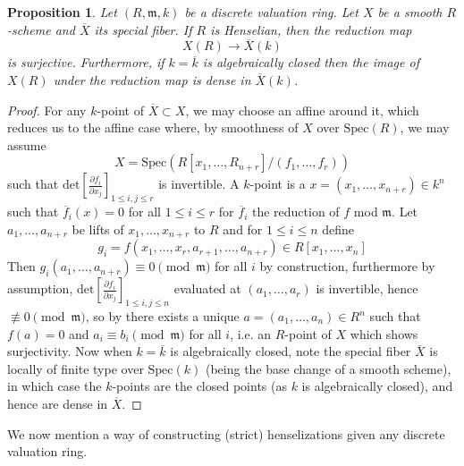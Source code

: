 \documentclass{article}
\theoremstyle{definition}
\theoremstyle{remark}
\theoremstyle{plain}
\newtheorem{proposition}[theorem]{Proposition}
\newcommand{\mk}[1]{\mathfrak{#1}}
\begin{document}
\begin{proposition}\label{prop:3.6}
	Let $(R, \mk{m}, k)$ be a discrete valuation ring. 
	Let $X$ be a smooth $R$-scheme and $\overline{X}$ its special fiber. 
	If $R$ is Henselian, then the reduction map
	\[X(R) \to \overline{X}(k)\]
	is surjective.
	Furthermore, if $k = \overline{k}$ is algebraically closed then the image of $X(R)$ under the reduction map is dense in $\overline{X}(k)$.
\end{proposition}

\begin{proof}
	For any $k$-point of $\overline{X} \subset X$, we may choose an affine around it, which reduces us to the affine case where, by smoothness of $X$ over $\text{Spec}(R)$, we may assume
	\[X = \text{Spec}(R[x_1, \dots, R_{n+r}]/(f_1, \dots, f_r))\]
	such that $\text{det}\left[ \frac{\partial f_i}{\partial x_j}\right]_{1 \leq i,j \leq r}$ is invertible.
	A $k$-point is a $x = (x_1, \dots, x_{n+r}) \in k^n$ such that $\overline{f}_i(x) = 0$ for all $1 \leq i \leq r$ for $\overline{f}_i$ the reduction of $f$ mod $\mk{m}$.
	Let $a_{1}, \dots, a_{n+r}$ be lifts of $x_{1}, \dots, x_{n+r}$ to $R$ and for $1 \leq i \leq n$ define
	\[g_i = f(x_1, \dots, x_r, a_{r+1}, \dots, a_{n+r}) \in R[x_1, \dots, x_n]\]
	Then $g_i(a_1, \dots, a_{n+r}) \equiv 0 \pmod{\mk{m}}$ for all $i$ by construction, furthermore by assumption, $\text{det}\left[ \frac{\partial f_i}{\partial x_j}\right]_{1 \leq i,j \leq n}$ evaluated at $(a_1, \dots, a_r)$ is invertible, hence $\not\equiv 0 \pmod{\mk{m}}$, so by  there exists a unique $a = (a_1, \dots, a_n) \in R^n$ such that $f(a) = 0$ and $a_i \equiv b_i \pmod{\mk{m}}$ for all $i$, i.e. an $R$-point of $X$ which shows surjectivity.
	Now when $k = \overline{k}$ is algebraically closed, note the special fiber $\overline{X}$ is locally of finite type over $\text{Spec}(k)$ (being the base change of a smooth scheme), in which case the $k$-points are the closed points (as $k$ is algebraically closed), and hence are dense in $\overline{X}$.
\end{proof}

We now mention a way of constructing (strict) henselizations given any discrete valuation ring.
\end{document}
